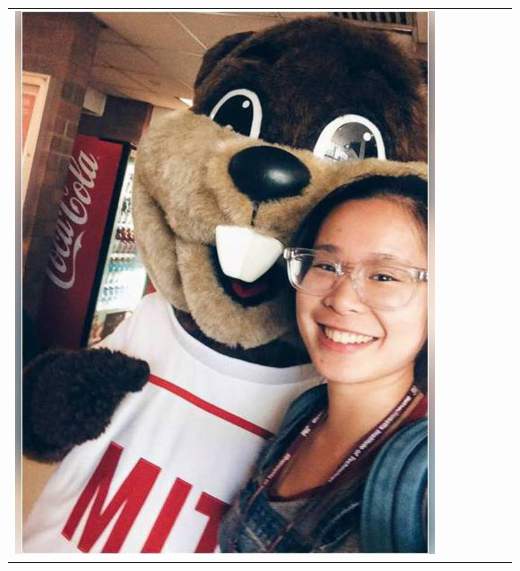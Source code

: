 \documentclass[landscape,a0paper,fontscale=0.292]{baposter}
\begin{document}
\begin{poster}
{\begin{center}
\begin{tabularx}{\linewidth}{X X X X X X}
{\centering \includegraphics[width=0.6\linewidth]{qlai.jpg}}\\ 


\end{tabularx}
\end{center}}
\end{poster}
\end{document}
